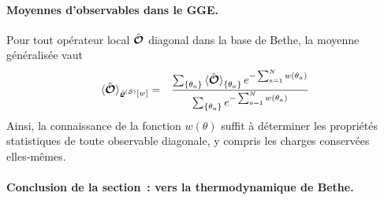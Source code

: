 \paragraph{Moyennes d'observables dans le GGE.}
Pour tout opérateur local $\hat{\bm{\mathcal{O}}}$ diagonal dans la base de Bethe,
la moyenne généralisée vaut
\begin{eqnarray}\label{chap.2.moyenne.1}
	\langle \hat{\bm{\mathcal{O}}}\rangle_{\hat{\bm{\varrho}}^{(\mathcal{S})}[w]} & = & \displaystyle   \frac{\sum_{\{\theta_a \}} \braket{ \hat{\bm{\mathcal{O}}}}_{\{ \theta_a\}} e^{- \sum_{a = 1}^N w(\theta_a) }  }{\sum_{\{\theta_a  \}} e^{- \sum_{a = 1}^N  w(\theta_a) } }
\end{eqnarray}
Ainsi, la connaissance de la fonction $w(\theta)$ suffit à déterminer
les propriétés statistiques de toute observable diagonale,
y compris les charges conservées elles‑mêmes.	
	

\paragraph{Conclusion de la section : vers la thermodynamique de Bethe.}

